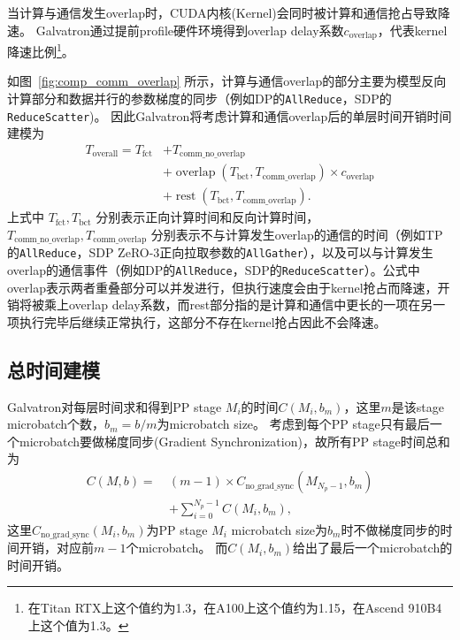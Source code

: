 \documentclass{thuemp}
\begin{document}
当计算与通信发生overlap时，CUDA内核(Kernel)会同时被计算和通信抢占导致降速。
Galvatron通过提前profile硬件环境得到overlap delay系数$c_{\text{overlap}}$，代表kernel降速比例\footnote{在Titan RTX上这个值约为1.3，在A100上这个值约为1.15，在Ascend 910B4上这个值为1.3。}。

如图~\ref{fig:comp_comm_overlap} 所示，计算与通信overlap的部分主要为模型反向计算部分和数据并行的参数梯度的同步（例如DP的\texttt{AllReduce}，SDP的\texttt{ReduceScatter})。
因此Galvatron将考虑计算和通信overlap后的单层时间开销时间建模为
\begin{align*}
    T_{\text{overall}} = T_{\text{fct}} & + T_{\text{comm\_no\_overlap}} \\
    & + \operatorname{overlap}(T_{\text{bct}}, T_{\text{comm\_overlap}}) \times c_{\text{overlap}} \\
    & + \operatorname{rest}(T_{\text{bct}}, T_{\text{comm\_overlap}}).
\end{align*}
上式中 $T_{\text{fct}}, T_{\text{bct}}$ 分别表示正向计算时间和反向计算时间，$T_{\text{comm\_no\_overlap}}, T_{\text{comm\_overlap}}$ 分别表示不与计算发生overlap的通信的时间（例如TP的\texttt{AllReduce}，SDP ZeRO-3正向拉取参数的\texttt{AllGather}），以及可以与计算发生overlap的通信事件（例如DP的\texttt{AllReduce}，SDP的\texttt{ReduceScatter}）。公式中overlap表示两者重叠部分可以并发进行，但执行速度会由于kernel抢占而降速，开销将被乘上overlap delay系数，而rest部分指的是计算和通信中更长的一项在另一项执行完毕后继续正常执行，这部分不存在kernel抢占因此不会降速。


\subsection{总时间建模}
Galvatron对每层时间求和得到PP stage $M_i$的时间$C(M_i, b_m)$，这里$m$是该stage microbatch个数，$b_m=b/m$为microbatch size。
考虑到每个PP stage只有最后一个microbatch要做梯度同步(Gradient Synchronization)，故所有PP stage时间总和为
\begin{align*}
    C(M,b) =\ & (m-1) \times  C_{\text{no\_grad\_sync}}(M_{N_p-1}, b_m) \\
    & + \sum_{i=0}^{N_p-1} C(M_i, b_m),
\end{align*}
这里$C_{\text{no\_grad\_sync}}(M_i, b_m)$为PP stage $M_i$ microbatch size为$b_m$时不做梯度同步的时间开销，对应前$m-1$个microbatch。
而$C(M_i,b_m)$给出了最后一个microbatch的时间开销。
\end{document}
